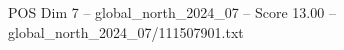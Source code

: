\begin{textsample}{POS Dim 7 – global\_north\_2024\_07 – Score 13.00 – global\_north\_2024\_07/111507901.txt}
\end{textsample}
